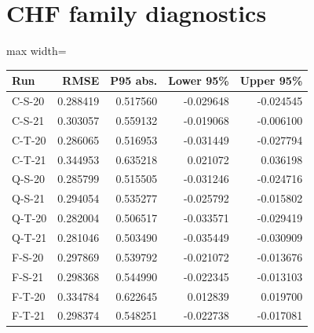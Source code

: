 \documentclass[11pt,oneside,openany]{book}
\begin{document}
\section*{CHF family diagnostics}
\begin{center}\footnotesize\sffamily\setlength{\tabcolsep}{3.5pt}\renewcommand{\arraystretch}{1.2}
\begin{adjustbox}{max width=\linewidth}\begin{tabular}{@{}lrrrr@{}}\toprule
Run & RMSE & P95 abs. & Lower 95\% & Upper 95\% \\ \midrule
C-S-20 & 0.288419 & 0.517560 & -0.029648 & -0.024545 \\
C-S-21 & 0.303057 & 0.559132 & -0.019068 & -0.006100 \\
C-T-20 & 0.286065 & 0.516953 & -0.031449 & -0.027794 \\
C-T-21 & 0.344953 & 0.635218 & 0.021072 & 0.036198 \\
Q-S-20 & 0.285799 & 0.515505 & -0.031246 & -0.024716 \\
Q-S-21 & 0.294054 & 0.535277 & -0.025792 & -0.015802 \\
Q-T-20 & 0.282004 & 0.506517 & -0.033571 & -0.029419 \\
Q-T-21 & 0.281046 & 0.503490 & -0.035449 & -0.030909 \\
F-S-20 & 0.297869 & 0.539792 & -0.021072 & -0.013676 \\
F-S-21 & 0.298368 & 0.544990 & -0.022345 & -0.013103 \\
F-T-20 & 0.334784 & 0.622645 & 0.012839 & 0.019700 \\
F-T-21 & 0.298374 & 0.548251 & -0.022738 & -0.017081 \\
\bottomrule\end{tabular}\end{adjustbox}\end{center}
\end{document}
